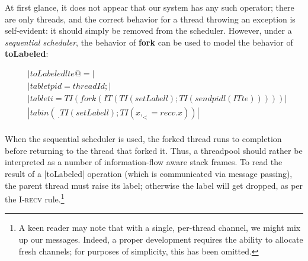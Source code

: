 At first glance, it does not appear that our system has any such operator;
there are only threads, and the correct behavior for a thread throwing
an exception is self-evident: it should simply be removed from the scheduler.
However, under a \emph{sequential scheduler}, the behavior of \textbf{fork}
can be used to model the behavior of \textbf{toLabeled}:

\begin{align*}
    & |toLabeled l te @= | \\
    & |tab let pid = threadId; | \\
    & |tab let i = TI (fork (IT (TI (setLabel l); TI (send pid l (IT te)))))| \\
    & |tab in (\ _ . TI (setLabel l); TI ( x, _ <= recv . x ))| \\
\end{align*}

When the sequential scheduler is used, the forked thread runs to
completion before returning to the thread that forked it.  Thus,
a threadpool should rather be interpreted as a number of information-flow
aware stack frames.  To read the result of a |toLabeled| operation
(which is communicated via message passing), the parent thread must raise
its label; otherwise the label will get dropped, as per the \textsc{I-recv} rule.\footnote{A keen reader may note that with a single, per-thread
channel, we might mix up our messages.  Indeed, a proper development requires
the ability to allocate fresh channels; for purposes of simplicity, this
has been omitted.}







